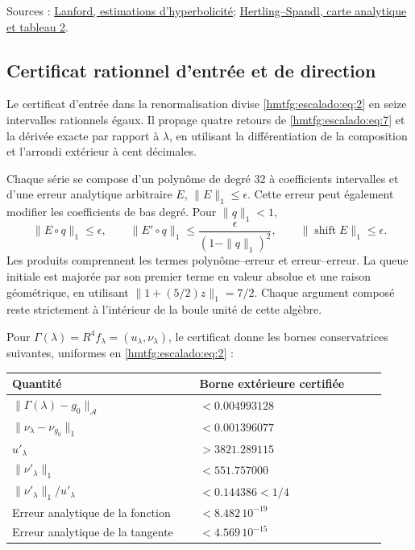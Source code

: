 Sources : \href{https://repo-archives.ihes.fr/A_GARDER/20180409/Test/I_Prepublications/LANFORD/1968-2013/P_81_17/P_81_17_web.pdf}{Lanford, estimations d’hyperbolicité}; \href{https://arxiv.org/pdf/1410.3277}{Hertling–Spandl, carte analytique et tableau 2}.


\subsection{Certificat rationnel d’entrée et de direction}
\label{hmtfg:escalado:4}

Le certificat d’entrée dans la renormalisation divise \eqref{hmtfg:escalado:eq:2} en seize intervalles rationnels égaux. Il propage quatre retours de \eqref{hmtfg:escalado:eq:7} et la dérivée exacte par rapport à \(\lambda\), en utilisant la différentiation de la composition et l’arrondi extérieur à cent décimales.

Chaque série se compose d’un polynôme de degré 32 à coefficients intervalles et d’une erreur analytique arbitraire \(E\), \(\|E\|_1\le\epsilon\). Cette erreur peut également modifier les coefficients de bas degré. Pour \(\|q\|_1<1\),
\begin{equation}
\|E\circ q\|_1\le\epsilon,\qquad
\|E'\circ q\|_1\le\frac{\epsilon}{(1-\|q\|_1)^2},\qquad
\|\operatorname{shift}E\|_1\le\epsilon.
\label{hmtfg:escalado:eq:10}
\end{equation}
Les produits comprennent les termes polynôme–erreur et erreur–erreur. La queue initiale est majorée par son premier terme en valeur absolue et une raison géométrique, en utilisant \(\|1+(5/2)z\|_1=7/2\). Chaque argument composé reste strictement à l’intérieur de la boule unité de cette algèbre.

Pour \(\Gamma(\lambda)=R^4f_\lambda=(u_\lambda,\nu_\lambda)\), le certificat donne les bornes conservatrices suivantes, uniformes en \eqref{hmtfg:escalado:eq:2} :

\begingroup\small
\begin{center}\begin{tabular}{p{0.465\linewidth}p{0.465\linewidth}}
\hline
Quantité & Borne extérieure certifiée \\
\hline
\(\|\Gamma(\lambda)-g_0\|_{\mathcal A}\) & \(<0.004993128\) \\
\(\|\nu_\lambda-\nu_{g_0}\|_1\) & \(<0.001396077\) \\
\(u'_\lambda\) & \(>3821.289115\) \\
\(\|\nu'_\lambda\|_1\) & \(<551.757000\) \\
\(\|\nu'_\lambda\|_1/u'_\lambda\) & \(<0.144386<1/4\) \\
Erreur analytique de la fonction & \(<8.482\,10^{-19}\) \\
Erreur analytique de la tangente & \(<4.569\,10^{-15}\) \\
\hline\end{tabular}\end{center}
\endgroup

